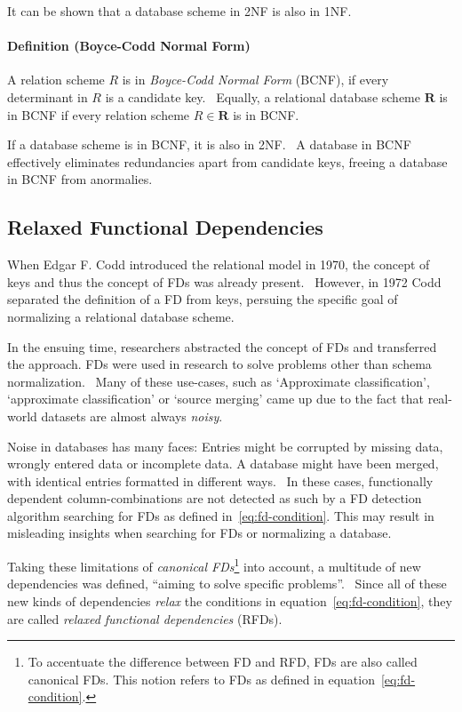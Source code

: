 It can be shown that a database scheme in 2NF is also in 1NF.~\cite[p.~58]{SCH17}

\paragraph{Definition (Boyce-Codd Normal Form)}
A relation scheme \( R \) is in \emph{Boyce-Codd Normal Form} (BCNF), if every determinant in \( R \) is a candidate key.~\cite[p.~65]{SCH17}
Equally, a relational database scheme \( \textbf{R} \) is in BCNF if every relation scheme \( R \in \textbf{R} \) is in BCNF.\

If a database scheme is in BCNF, it is also in 2NF.~\cite[p.~58]{SCH17} A database in BCNF effectively eliminates redundancies apart from candidate keys, freeing a database in BCNF from anormalies.~\cite[p.~67]{SCH17}


\subsection{Relaxed Functional Dependencies}
When Edgar F. Codd introduced the relational model in 1970, the concept of keys and thus the concept of FDs was already present.~\cite[p.~70]{MAI83}
However, in 1972 Codd separated the definition of a FD from keys, persuing the specific goal of normalizing a relational database scheme.

In the ensuing time, researchers abstracted the concept of FDs and transferred the approach.
FDs were used in research to solve problems other than schema normalization.~\cite[p.~161]{CAR16}
Many of these use-cases, such as `Approximate classification', `approximate classification' or `source merging' came up due to the fact that real-world datasets are almost always \emph{noisy}.

Noise in databases has many faces:
Entries might be corrupted by missing data, wrongly entered data or incomplete data.
A database might have been merged, with identical entries formatted in different ways.~\cite[p.~1]{KOU09}
In these cases, functionally dependent column-combinations are not detected as such by a FD detection algorithm searching for FDs as defined in~\ref{eq:fd-condition}.
This may result in misleading insights when searching for FDs or normalizing a database.

Taking these limitations of \emph{canonical FDs}\footnote{To accentuate the difference between FD and RFD, FDs are also called canonical FDs. This notion refers to FDs as defined in equation~\ref{eq:fd-condition}.} into account, a multitude of new dependencies was defined, ``aiming to solve specific problems''.~\cite[p.~147]{CAR16}
Since all of these new kinds of dependencies \emph{relax} the conditions in equation~\ref{eq:fd-condition}, they are called \emph{relaxed functional dependencies} (RFDs).


